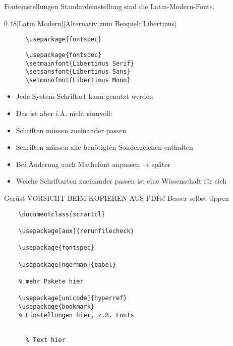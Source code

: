 \begin{frame}[fragile]{
  Fonteinstellungen
  \hfill
}
  Standardeinstellung sind die Latin-Modern-Fonts.
  \vspace{1em}
  \begin{CodeExplanation}{0.48}[Latin Modern][Alternativ zum Beispiel: Libertinus]
    \begin{verbatim}
      \usepackage{fontspec}
    \end{verbatim}
  \Explanation
    \begin{verbatim}
      \usepackage{fontspec}
      \setmainfont{Libertinus Serif}
      \setsansfont{Libertinus Sans}
      \setmonofont{Libertinus Mono}
    \end{verbatim}
  \end{CodeExplanation}
  \begin{itemize}
    \item Jede System-Schriftart kann genutzt werden
    \item \alert{Das ist aber i.A. nicht sinnvoll: }
    \item Schriften müssen zueinander passen
    \item Schriften müssen alle benötigten Sonderzeichen enthalten
    \item Bei Änderung auch Mathefont anpassen → später
    \item Welche Schriftarten zueinander passen ist eine Wissenschaft für sich
  \end{itemize}
\end{frame}

\begin{frame}[fragile]{Gerüst}
  \alert{VORSICHT BEIM KOPIEREN AUS PDFs! Besser selbst tippen}

  \begin{verbatim}
    \documentclass{scrartcl}

    \usepackage[aux]{rerunfilecheck}

    \usepackage{fontspec}

    \usepackage[ngerman]{babel}

    % mehr Pakete hier

    \usepackage[unicode]{hyperref}
    \usepackage{bookmark}
    % Einstellungen hier, z.B. Fonts

    
      % Text hier
    
  \end{verbatim}
\end{frame}

